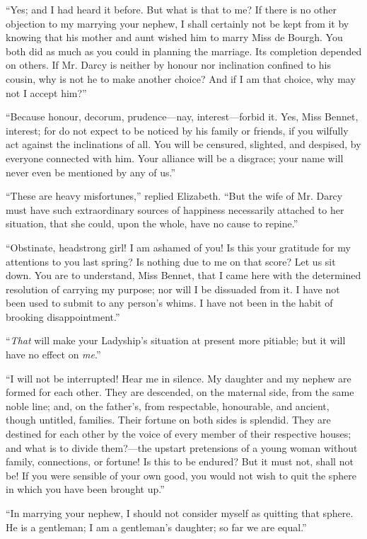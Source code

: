 ``Yes; and I had heard it before. But what is that to me? If there is no other objection to my marrying your nephew, I shall certainly not be kept from it by knowing that his mother and aunt wished him to marry Miss de Bourgh. You both did as much as you could in planning the marriage. Its completion depended on others. If Mr. Darcy is neither by honour nor inclination confined to his cousin, why is not he to make another choice? And if I am that choice, why may not I accept him?''

``Because honour, decorum, prudence---nay, interest---forbid it. Yes, Miss Bennet, interest; for do not expect to be noticed by his family or friends, if you wilfully act against the inclinations of all. You will be censured, slighted, and despised, by everyone connected with him. Your alliance will be a disgrace; your name will never even be mentioned by any of us.''

``These are heavy misfortunes,'' replied Elizabeth. ``But the wife of Mr. Darcy must have such extraordinary sources of happiness necessarily attached to her situation, that she could, upon the whole, have no cause to repine.''

``Obstinate, headstrong girl! I am ashamed of you! Is this your gratitude for my attentions to you last spring? Is nothing due to me on that score? Let us sit down. You are to understand, Miss Bennet, that I came here with the determined resolution of carrying my purpose; nor will I be dissuaded from it. I have not been used to submit to any person's whims. I have not been in the habit of brooking disappointment.''

``\textit{That} will make your Ladyship's situation at present more pitiable; but it will have no effect on \textit{me}.''

``I will not be interrupted! Hear me in silence. My daughter and my nephew are formed for each other. They are descended, on the maternal side, from the same noble line; and, on the father's, from respectable, honourable, and ancient, though untitled, families. Their fortune on both sides is splendid. They are destined for each other by the voice of every member of their respective houses; and what is to divide them?---the upstart pretensions of a young woman without family, connections, or fortune! Is this to be endured? But it must not, shall not be! If you were sensible of your own good, you would not wish to quit the sphere in which you have been brought up.''

``In marrying your nephew, I should not consider myself as quitting that sphere. He is a gentleman; I am a gentleman's daughter; so far we are equal.''

